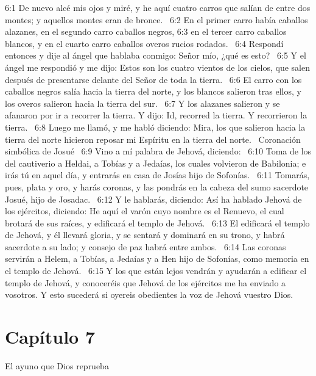6:1 De nuevo alcé mis ojos y miré, y he aquí cuatro carros que salían de entre dos montes; y aquellos montes eran de bronce.  
6:2 En el primer carro había caballos alazanes, en el segundo carro caballos negros, 
6:3 en el tercer carro caballos blancos, y en el cuarto carro caballos overos rucios rodados.  
6:4 Respondí entonces y dije al ángel que hablaba conmigo: Señor mío, ¿qué es esto?  
6:5 Y el ángel me respondió y me dijo: Estos son los cuatro vientos de los cielos, que salen después de presentarse delante del Señor de toda la tierra.  
6:6 El carro con los caballos negros salía hacia la tierra del norte, y los blancos salieron tras ellos, y los overos salieron hacia la tierra del sur.  
6:7 Y los alazanes salieron y se afanaron por ir a recorrer la tierra. Y dijo: Id, recorred la tierra. Y recorrieron la tierra.  
6:8 Luego me llamó, y me habló diciendo: Mira, los que salieron hacia la tierra del norte hicieron reposar mi Espíritu en la tierra del norte.  
Coronación simbólica de Josué  
6:9 Vino a mí palabra de Jehová, diciendo:  
6:10 Toma de los del cautiverio a Heldai, a Tobías y a Jedaías, los cuales volvieron de Babilonia; e irás tú en aquel día, y entrarás en casa de Josías hijo de Sofonías.  
6:11 Tomarás, pues, plata y oro, y harás coronas, y las pondrás en la cabeza del sumo sacerdote Josué, hijo de Josadac.  
6:12 Y le hablarás, diciendo: Así ha hablado Jehová de los ejércitos, diciendo: He aquí el varón cuyo nombre es el Renuevo, el cual brotará de sus raíces, y edificará el templo de Jehová.  
6:13 El edificará el templo de Jehová, y él llevará gloria, y se sentará y dominará en su trono, y habrá sacerdote a su lado; y consejo de paz habrá entre ambos.  
6:14 Las coronas servirán a Helem, a Tobías, a Jedaías y a Hen hijo de Sofonías, como memoria en el templo de Jehová.  
6:15 Y los que están lejos vendrán y ayudarán a edificar el templo de Jehová, y conoceréis que Jehová de los ejércitos me ha enviado a vosotros. Y esto sucederá si oyereis obedientes la voz de Jehová vuestro Dios.  
\section*{Capítulo 7 }
El ayuno que Dios reprueba  

